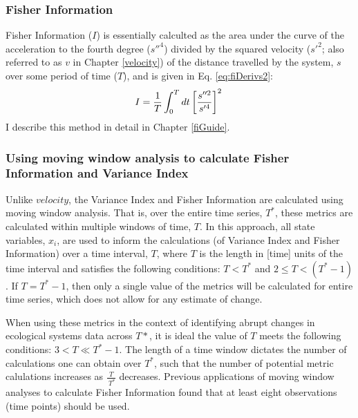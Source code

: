 \documentclass[12pt,twoside,openany]{reedthesis}
\begin{document}
\hypertarget{fisher-information}{%
\subsubsection{Fisher Information}\label{fisher-information}}

Fisher Information (\(I\)) is essentially calculted as the area under the curve of the acceleration to the fourth degree (\(s''^4\)) divided by the squared velocity (\(s'^2\); also referred to as \(v\) in Chapter \ref{velocity}) of the distance travelled by the system, \(s\) over some period of time (\(T\)), and is given in Eq. \eqref{eq:fiDerivs2}:
\begin{equation}   
    I = \frac{1}{T} \int_0^T dt\left[\frac{s''^2}{s'^4}\right]^2 \\  
  \label{eq:fiDerivs2}  
\end{equation}
I describe this method in detail in Chapter \ref{fiGuide}.

\hypertarget{using-moving-window-analysis-to-calculate-fisher-information-and-variance-index}{%
\subsubsection{Using moving window analysis to calculate Fisher Information and Variance Index}\label{using-moving-window-analysis-to-calculate-fisher-information-and-variance-index}}

Unlike \(velocity\), the Variance Index and Fisher Information are calculated using moving window analysis. That is, over the entire time series, \(T^*\), these metrics are calculated within multiple windows of time, \(T\). In this approach, all state variables, \(x_i\), are used to inform the calculations (of Variance Index and Fisher Information) over a time interval, \(T\), where \(T\) is the length in {[}time{]} units of the time interval and satisfies the following conditions: \(T < T^*\) and \(2\leq T < (T^*-1)\). If \(T = T^*-1\), then only a single value of the metrics will be calculated for entire time series, which does not allow for any estimate of change.

When using these metrics in the context of identifying abrupt changes in ecological systems data across \(T*\), it is ideal the value of \(T\) meets the following conditions: \(3 < T \ll T^*-1\). The length of a time window dictates the number of calculations one can obtain over \(T^*\), such that the number of potential metric calulations increases as \(\frac{T}{\ T^*}\) decreases. Previous applications of moving window analyses to calculate Fisher Information found that at least eight observations (time points) should be used.
\end{document}

